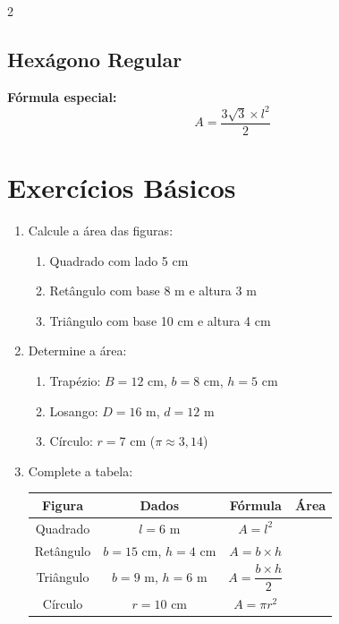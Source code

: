 \documentclass[11pt]{article}
\begin{document}
\begin{multicols}{2}
\subsection*{Hexágono Regular}

\begin{center}
\end{center}

\textbf{Fórmula especial:}
\[
A = \frac{3\sqrt{3} \times l^2}{2}
\]

\section*{Exercícios Básicos}

\begin{enumerate}[leftmargin=*]

\item Calcule a área das figuras:
\begin{enumerate}[label=\alph*)]
\item Quadrado com lado 5 cm
\item Retângulo com base 8 m e altura 3 m
\item Triângulo com base 10 cm e altura 4 cm
\end{enumerate}

\item Determine a área:
\begin{enumerate}[label=\alph*)]
\item Trapézio: $B = 12$ cm, $b = 8$ cm, $h = 5$ cm
\item Losango: $D = 16$ m, $d = 12$ m
\item Círculo: $r = 7$ cm ($\pi \approx 3,14$)
\end{enumerate}

\item Complete a tabela:

\begin{center}
\begin{tabular}{|c|c|c|c|}
\hline
\textbf{Figura} & \textbf{Dados} & \textbf{Fórmula} & \textbf{Área} \\
\hline
Quadrado & $l = 6$ m & $A = l^2$ & \\
\hline
Retângulo & $b = 15$ cm, $h = 4$ cm & $A = b \times h$ & \\
\hline
Triângulo & $b = 9$ m, $h = 6$ m & $A = \dfrac{b \times h}{2}$ & \\
\hline
Círculo & $r = 10$ cm & $A = \pi r^2$ & \\
\hline
\end{tabular}
\end{center}


\end{enumerate}
\end{multicols}
\end{document}
